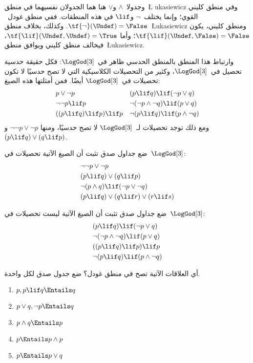 \documentclass[../../../include/open-logic-section]{subfiles}
\begin{document}
وجدولا~$\land$ و$\lor$ هنا هما الجدولان نفسيهما في منطق~\L
ukasiewicz وفي منطق كليني القوي؛ وإنما يختلف~$\lnot$ و$\lif$ في
هذه المنطقات. ففي منطق غودل~$\tf{\lnot}(\Undef) = \False$.
وكذلك، بخلاف منطق~\L ukasiewicz ومنطق كليني، يكون
$\tf{\lif}(\Undef, \False) = \False$؛ وأما
$\tf{\lif}(\Undef, \Undef) = \True$، فيخالف منطق كليني ويوافق
منطق~\L ukasiewicz.

وارتباط هذا المنطق بالمنطق الحدسي ظاهر في~$\LogGod[3]$: فكل حقيقة
حدسية تحصيل في~$\LogGod[3]$، وكثير من التحصيلات الكلاسيكية التي لا تصح حدسيًا لا
تكون تحصيلات في~$\LogGod[3]$ أيضًا. فمن أمثلتها هذه الصيغ:
\begin{align*}
  & p \lor \lnot p && (p \lif q) \lif (\lnot p \lor q) \\
  & \lnot\lnot p \lif p && \lnot(\lnot p \land \lnot q) \lif (p \lor q) \\
  & ((p \lif q) \lif p) \lif p && \lnot(p \lif q) \lif (p \land \lnot q)
\end{align*}
ومع ذلك توجد تحصيلات لـ~$\LogGod[3]$ لا تصح حدسيًا، ومنها
$\lnot\lnot p \lor \lnot p$ و~$(p \lif q) \lor (q \lif p)$.

\begin{prob}
  ضع جداول صدق تثبت أن الصيغ الآتية تحصيلات في~$\LogGod[3]$:
  \begin{align*}
    & \lnot\lnot p \lor \lnot p\\
    & (p \lif q) \lor (q \lif p) \\
    & \lnot(p \land q) \lif (\lnot p \lor \lnot q) \\
    & (p \lif q) \lor (q \lif r) \lor (r \lif s)
  \end{align*}
\end{prob}

\begin{prob}
  ضع جداول صدق تثبت أن الصيغ الآتية ليست تحصيلات في~$\LogGod[3]$:
  \begin{align*}
    & (p \lif q) \lif (\lnot p \lor q) \\
    & \lnot(\lnot p \land \lnot q) \lif (p \lor q) \\
    & ((p \lif q) \lif p) \lif p \\
    & \lnot(p \lif q) \lif (p \land \lnot q)
  \end{align*}
\end{prob}

\begin{prob}
  أي العلاقات الآتية تصح في منطق غودل؟ ضع جدول صدق لكل واحدة.
  \begin{enumerate}
    \item $p, p \lif q \Entails q$
    \item $p \lor q, \lnot p \Entails q$
    \item $p \land q \Entails p$
    \item $p \Entails p \land p$
    \item $p \Entails p \lor q$
  \end{enumerate}
\end{prob}
\end{document}
